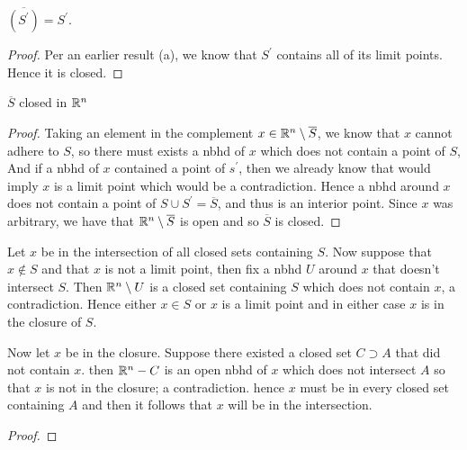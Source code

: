 \begin{alphaparts}
        \questionpart
        $\overline{(S^\prime)} = S^\prime$. 

        \begin{proof}
            Per an earlier result (a), we know that $S^\prime$ contains all of its limit points. Hence 
            it is closed. 
        \end{proof}


        \questionpart 
        $\overline{S}$ closed in $\mathbb{R}^n$

        \begin{proof}
            Taking an element in the complement $x \in \mathbb{R}^n \setminus \overline{S}$, we know that $x$ cannot adhere to $S$, 
            so there must exists a nbhd of $x$ which does not contain a point of $S$, And if a nbhd of $x$ contained a point of $s^\prime$, 
            then we already know that would imply $x$ is a limit point which would be a contradiction. Hence  a nbhd around $x$ does not 
            contain a point of $S \cup S^\prime = \overline{S}$, and thus is an interior point. Since $x$ was arbitrary, we have that 
            $\mathbb{R}^n \setminus \overline{S}$ is open and so $\overline{S}$ is closed. 

        \end{proof}

        \questionpart 
        Let $x$ be in the intersection of all closed sets containing $S$. Now suppose that $x \notin S$  and that $x$ is not a limit point, 
        then fix a nbhd $U$ around $x$ that doesn't intersect $S$. Then $\mathbb{R}^n \setminus U$ is a closed set containing $S$ which does not contain $x$, a contradiction. 
        Hence either $x \in S$ or $x$ is a limit point and in either case $x$ is in the closure of $S$. 

        Now let $x$ be in the closure. Suppose there existed a closed set $C \supset A$ that did not contain $x$. 
        then $\mathbb{R}^n - C$ is an open nbhd of $x$ which does not intersect $A$ so that $x$ is not in the closure; a contradiction. 
        hence $x$ must be in every closed set containing $A$ and then it follows that $x$ will be in the intersection. 
        \begin{proof}
            
        \end{proof}
    \end{alphaparts}

